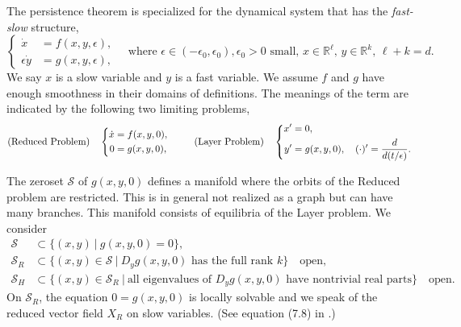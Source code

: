 \documentclass[a4paper,11pt]{article}
\def\blue{\color{blue}}
\theoremstyle{remark}
\begin{document}
The persistence theorem is specialized for the dynamical system that has the {\it fast-slow} structure, 
\begin{equation} \label{eq:fast-slow}
 \left\{
 \begin{aligned}
  \dot{x}&=f(x,y,\epsilon),\\
  \epsilon\dot{y}&=g(x,y,\epsilon),
 \end{aligned}\right. \quad \text{where $\epsilon \in (-\epsilon_0,\epsilon_0), \epsilon_0>0$ small, $x\in \mathbb{R}^\ell$, $y\in \mathbb{R}^k$, $\ell+k=d$.}
\end{equation}
We say $x$ is a slow variable and $y$ is a fast variable. We assume $f$ and $g$ have enough smoothness in their domains of definitions. The meanings of the term are indicated by the following two limiting problems,
\begin{equation*} %
 \text{(Reduced Problem)}\quad\left\{
 \begin{aligned}
    \dot{x} &= f(x,y,0),\\
    0&= g(x,y,0),
 \end{aligned}\right. 
 \hspace{2.5em}
 \text{(Layer Problem)} \quad  
 \left\{
 \begin{aligned}
    x'&= 0,\\
    y'&= g(x,y,0), \quad (\cdot)' = \frac{d}{d(t/\epsilon)}.%
 \end{aligned}\right. 
\end{equation*}

The zeroset $\mathcal{S}$ of $g(x,y,0)$ defines a manifold where the orbits of the Reduced problem are restricted. {\blue This is in general not realized as a graph but can have many branches.} This manifold consists of equilibria of the Layer problem. We consider 
\begin{align*}
 \mathcal{S}&\subset \Big\{ (x,y)\:\Big|\: g(x,y,0)=0\Big\},\\
 \mathcal{S}_R&\subset \Big\{ (x,y)\in \mathcal{S} \:\Big|\: \text{$D_y g(x,y,0)$ has the full rank $k$}\Big\} \quad \text{open},\\
 \mathcal{S}_H&\subset \Big\{ (x,y)\in \mathcal{S}_R \:\Big|\: \text{all eigenvalues of $D_y g(x,y,0)$ have nontrivial real parts}\Big\}\quad \text{open}. 
\end{align*}
On $\mathcal{S}_R$, the equation $0=g(x,y,0)$ is locally solvable and we speak of the reduced vector field $X_R$ on slow variables. (See equation (7.8) in \cite{fenichel_geometric_1979}.) %
\end{document}
